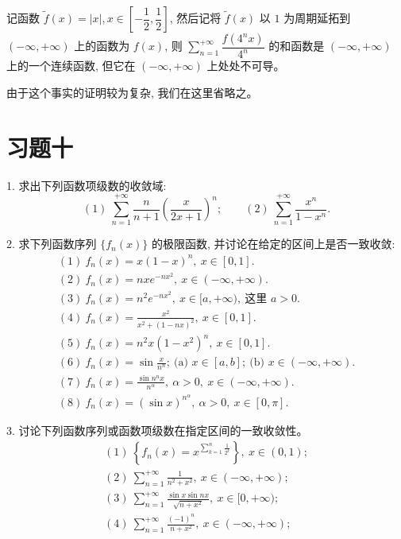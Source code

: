 \documentclass[UTF8,12pt,a4paper,fontset=fandol]{ctexart}
\begin{document}
记函数 $\widetilde f(x)=|x|, x\in\left[-\dfrac12,\dfrac12\right]$, 然后记将 $\widetilde f(x)$ 以 $1$ 为周期延拓到 $(-\infty,+\infty)$ 上的函数为 $f(x)$, 则 $\sum\limits_{n=1}^{+\infty}\dfrac{f(4^n x)}{4^n}$ 的和函数是 $(-\infty,+\infty)$ 上的一个连续函数, 但它在 $(-\infty,+\infty)$ 上处处不可导。

由于这个事实的证明较为复杂, 我们在这里省略之。

\section*{习题十}

1. 求出下列函数项级数的收敛域:
\[
  (1)\ \sum_{n=1}^{+\infty}\frac{n}{n+1}\left(\frac{x}{2x+1}\right)^n;\qquad
  (2)\ \sum_{n=1}^{+\infty}\frac{x^n}{1-x^n}.
\]

2. 求下列函数序列 $\{f_n(x)\}$ 的极限函数, 并讨论在给定的区间上是否一致收敛:
\[
\begin{gathered}
  (1)\ f_n(x)=x(1-x)^n,\ x\in[0,1].\\
  (2)\ f_n(x)=nxe^{-nx^2},\ x\in(-\infty,+\infty).\\
  (3)\ f_n(x)=n^2e^{-nx^2},\ x\in[a,+\infty),\ \text{这里 }a>0.\\
  (4)\ f_n(x)=\frac{x^2}{x^2+(1-nx)^2},\ x\in[0,1].\\
  (5)\ f_n(x)=n^2x(1-x^2)^n,\ x\in[0,1].\\
  (6)\ f_n(x)=\sin\frac{x}{n^n};\ \text{(a) }x\in[a,b];\ \text{(b) }x\in(-\infty,+\infty).\\
  (7)\ f_n(x)=\frac{\sin n^n x}{n^\alpha},\ \alpha>0,\ x\in(-\infty,+\infty).\\
  (8)\ f_n(x)=(\sin x)^{n^\alpha},\ \alpha>0,\ x\in[0,\pi].
\end{gathered}
\]

3. 讨论下列函数序列或函数项级数在指定区间的一致收敛性。
\[
\begin{gathered}
  (1)\ \left\{f_n(x)=x^{\sum_{k=1}^n\frac1{2^k}}\right\},\ x\in(0,1);\\
  (2)\ \sum_{n=1}^{+\infty}\frac1{n^2+x^2},\ x\in(-\infty,+\infty);\\
  (3)\ \sum_{n=1}^{+\infty}\frac{\sin x\sin nx}{\sqrt{n+x^2}},\ x\in[0,+\infty);\\
  (4)\ \sum_{n=1}^{+\infty}\frac{(-1)^n}{n+x^2},\ x\in(-\infty,+\infty);
\end{gathered}
\]
\end{document}
